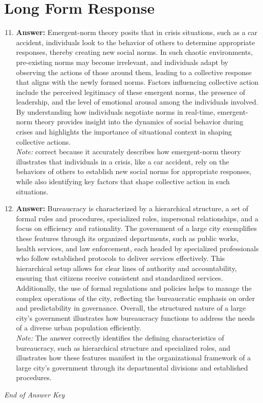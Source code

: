 \documentclass[12pt]{article}
\begin{document}
\section*{Long Form Response}
\begin{enumerate}[label=\arabic*.]
\setcounter{enumi}{10}
\item \textbf{Answer:} Emergent-norm theory posits that in crisis situations, such as a car accident, individuals look to the behavior of others to determine appropriate responses, thereby creating new social norms. In such chaotic environments, pre-existing norms may become irrelevant, and individuals adapt by observing the actions of those around them, leading to a collective response that aligns with the newly formed norms. Factors influencing collective action include the perceived legitimacy of these emergent norms, the presence of leadership, and the level of emotional arousal among the individuals involved. By understanding how individuals negotiate norms in real-time, emergent-norm theory provides insight into the dynamics of social behavior during crises and highlights the importance of situational context in shaping collective actions.
\\ \textit{Note:} correct because it accurately describes how emergent-norm theory illustrates that individuals in a crisis, like a car accident, rely on the behaviors of others to establish new social norms for appropriate responses, while also identifying key factors that shape collective action in such situations.
\item \textbf{Answer:} Bureaucracy is characterized by a hierarchical structure, a set of formal rules and procedures, specialized roles, impersonal relationships, and a focus on efficiency and rationality. The government of a large city exemplifies these features through its organized departments, such as public works, health services, and law enforcement, each headed by specialized professionals who follow established protocols to deliver services effectively. This hierarchical setup allows for clear lines of authority and accountability, ensuring that citizens receive consistent and standardized services. Additionally, the use of formal regulations and policies helps to manage the complex operations of the city, reflecting the bureaucratic emphasis on order and predictability in governance. Overall, the structured nature of a large city's government illustrates how bureaucracy functions to address the needs of a diverse urban population efficiently.
\\ \textit{Note:} The answer correctly identifies the defining characteristics of bureaucracy, such as hierarchical structure and specialized roles, and illustrates how these features manifest in the organizational framework of a large city's government through its departmental divisions and established procedures.
\end{enumerate}

\vfill
\noindent\textit{End of Answer Key}
\end{document}
